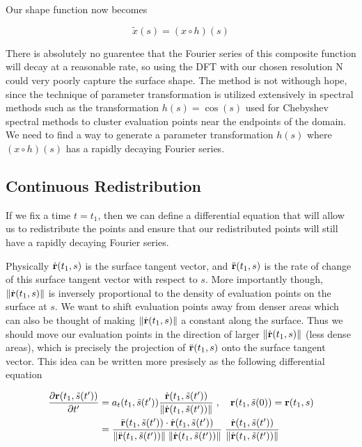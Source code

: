 Our shape function now becomes

\[ \tilde{x}(s) = (x \circ h)(s) \]

There is absolutely no guarentee that the Fourier series of this composite function will decay at a reasonable rate, so using the DFT with our chosen resolution N could very poorly capture the surface shape. The method is not withough hope, since the technique of parameter transformation is utilized extensively in spectral methods such as the transformation $h(s) = \cos(s)$ used for Chebyshev spectral methods to cluster evaluation points near the endpoints of the domain. We need to find a way to generate a parameter transformation $h(s)$ where $(x \circ h)(s)$ has a rapidly decaying Fourier series.

\subsection*{Continuous Redistribution}

If we fix a time $t = t_1$, then we can define a differential equation that will allow us to redistribute the points and ensure that our redistributed points will still have a rapidly decaying Fourier series.

Physically $\dot{\mathbf{r}}(t_1, s)$ is the surface tangent vector, and $\ddot{\mathbf{r}}(t_1, s)$ is the rate of change of this surface tangent vector with respect to $s$. More importantly though, $\norm{\dot{\bvec{r}}(t_1, s)}$ is inversely proportional to the density of evaluation points on the surface at $s$. We want to shift evaluation points away from denser areas which can also be thought of making $\norm{\dot{\bvec{r}}(t_1, s)}$ a constant along the surface. Thus we should move our evaluation points in the direction of larger $\norm{\dot{\bvec{r}}(t_1, s)}$ (less dense areas), which is precisely the projection of $\ddot{\mathbf{r}}(t_1, s)$ onto the surface tangent vector. This idea can be written more presisely as the following differential equation

\begin{align}
  \frac{\partial \bvec{r}(t_1, \tilde{s}(t'))}{\partial t'}& = a_t(t_1, \tilde{s}(t')) \frac{\dot{\bvec{r}}(t_1, \tilde{s}(t'))}{\norm{\dot{\bvec{r}}(t_1, \tilde{s}(t'))}} \; , \quad \bvec{r}(t_1, \tilde{s}(0)) = \bvec{r}(t_1, s)  \notag \\
  &= \frac{\ddot{\bvec{r}}(t_1, \tilde{s}(t')) \cdot \dot{\bvec{r}}(t_1, \tilde{s}(t'))}{\norm{\ddot{\bvec{r}}(t_1, \tilde{s}(t'))} \; \norm{\dot{\bvec{r}}(t_1, \tilde{s}(t'))}} \; \frac{\dot{\bvec{r}}(t_1, \tilde{s}(t'))}{\norm{\dot{\bvec{r}}(t_1, \tilde{s}(t'))}} \label{eq:redist-diff-eq}
\end{align}

